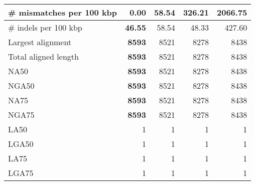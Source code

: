 \documentclass[12pt,a4paper]{article}
\begin{document}
\begin{table}[ht]
\begin{center}
\begin{tabular}{|l*{4}{|r}|}
\# mismatches per 100 kbp & {\bf 0.00} & 58.54 & 326.21 & 2066.75 \\ \hline
\# indels per 100 kbp & {\bf 46.55} & 58.54 & 48.33 & 427.60 \\ \hline
Largest alignment & {\bf 8593} & 8521 & 8278 & 8438 \\ \hline
Total aligned length & {\bf 8593} & 8521 & 8278 & 8438 \\ \hline
NA50 & {\bf 8593} & 8521 & 8278 & 8438 \\ \hline
NGA50 & {\bf 8593} & 8521 & 8278 & 8438 \\ \hline
NA75 & {\bf 8593} & 8521 & 8278 & 8438 \\ \hline
NGA75 & {\bf 8593} & 8521 & 8278 & 8438 \\ \hline
LA50 & 1 & 1 & 1 & 1 \\ \hline
LGA50 & 1 & 1 & 1 & 1 \\ \hline
LA75 & 1 & 1 & 1 & 1 \\ \hline
LGA75 & 1 & 1 & 1 & 1 \\ \hline
\end{tabular}
\end{center}
\end{table}
\end{document}
